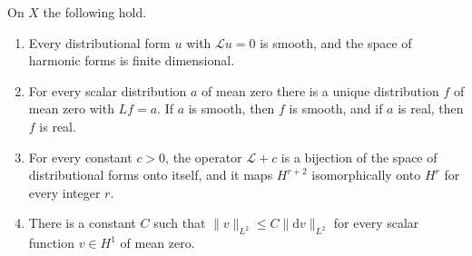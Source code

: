 \begin{lemma}\label{lem:compact-elliptic-foundations}
On $X$ the following hold.
\begin{enumerate}
\item Every distributional form $u$ with $\mathcal Lu=0$ is smooth, and the space of harmonic forms is finite dimensional.
\item For every scalar distribution $a$ of mean zero there is a unique distribution $f$ of mean zero with $Lf=a$. If $a$ is smooth, then $f$ is smooth, and if $a$ is real, then $f$ is real.
\item For every constant $c>0$, the operator $\mathcal L+c$ is a bijection of the space of distributional forms onto itself, and it maps $H^{r+2}$ isomorphically onto $H^r$ for every integer $r$.
\item There is a constant $C$ such that $\|v\|_{L^2}\leq C\|\mathrm dv\|_{L^2}$ for every scalar function $v\in H^1$ of mean zero.
\end{enumerate}
\end{lemma}
